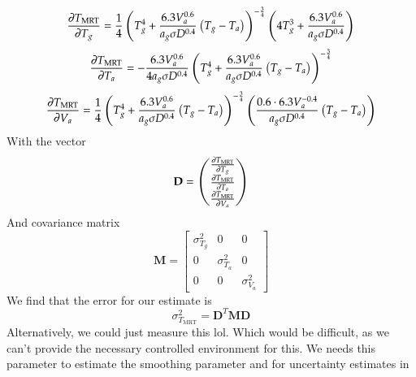 \documentclass[]{scrartcl}
\begin{document}
$$
\diffp{T_{\text{MRT}}}{T_g} = \frac{1}{4}\left(T_g^4 + \frac{6.3V_a^{0.6}}{a_g\sigma D^{0.4}}\left(T_g - T_a\right)\right)^{-\frac{3}{4}}\left(4T_g^3 + \frac{6.3V_a^{0.6}}{a_g\sigma D^{0.4}}\right)
$$
$$
\diffp{T_{\text{MRT}}}{T_a} = -\frac{6.3V_a^{0.6}}{4a_g\sigma D^{0.4}}\left(T_g^4 + \frac{6.3V_a^{0.6}}{a_g\sigma D^{0.4}}\left(T_g - T_a\right)\right)^{-\frac{3}{4}}
$$
$$
\diffp{T_{\text{MRT}}}{V_a} = \frac{1}{4}\left(T_g^4 + \frac{6.3V_a^{0.6}}{a_g\sigma D^{0.4}}\left(T_g - T_a\right)\right)^{-\frac{3}{4}}\left(\frac{0.6\cdot6.3V_a^{-0.4}}{a_g\sigma D^{0.4}}\left(T_g - T_a\right)\right)
$$
With the vector
$$
\mathbf{D} = \begin{pmatrix}
	\diffp{T_{\text{MRT}}}{T_g} \\
	\diffp{T_{\text{MRT}}}{T_a} \\
	\diffp{T_{\text{MRT}}}{V_a}
\end{pmatrix}
$$
And covariance matrix
$$
\mathbf{M} = \begin{bmatrix}
	\sigma_{T_g}^2 & 0 & 0 \\
	0 & \sigma_{T_a}^2 & 0 \\
	0 & 0 & \sigma_{V_a}^2
\end{bmatrix}
$$
We find that the error for our estimate is
$$
\sigma_{T_{\text{MRT}}}^2 = \mathbf{D}^T\mathbf{M}\mathbf{D}
$$
Alternatively, we could just measure this lol. Which would be difficult, as we can't provide the necessary controlled environment for this. We needs this parameter to estimate the smoothing parameter and for uncertainty estimates in
\end{document}
